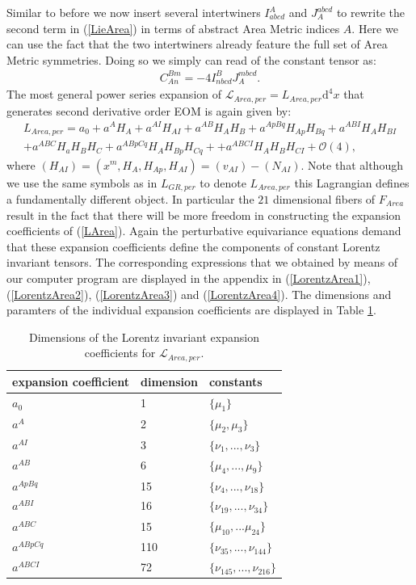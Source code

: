 \documentclass[a4paper,12pt, DIV=14, BCOR=5mm, twoside, headsepline, numbers=noenddot]{scrbook}
\begin{document}
Similar to before we now insert several intertwiners $I^A_{abcd}$ and $J_A^{abcd}$ to rewrite the second term in (\ref{LieArea}) in terms of abstract Area Metric indices $A$. Here we can use the fact that the two intertwiners already feature the full set of Area Metric symmetries.  Doing so we simply can read of the constant tensor as:
\begin{align}\label{areaGotayMInter}
    C_{An}^{Bm} = -4 I^B_{nbcd} J_A^{mbcd}.
\end{align}
The most general power series expansion of $\mathcal{L}_{Area,per} = L_{Area,per}\mathrm{d}^4x$ that generates second derivative order EOM is again given by:
\begin{align}\label{LArea}
    L_{Area,per} =  a_0 + a^A H_A + a^{AI}H_{AI} + a^{AB} H_{A}H_{B} + a^{ApBq} H_{Ap}H_{Bq} + a^{ABI} H_{A} H_{BI} \\
    + a^{ABC} H_a H_B H_C + a^{ABpCq} H_{A}H_{Bp}H_{Cq} +
    + a^{ABCI} H_A H_B H_{CI} 
    + \mathcal{O}(4),
\end{align}
where $(H_{AI}) = (x^m,H_A,H_{Ap},H_{AI}) = (v_{AI}) - (N_{AI})$. Note that although we use the same symbols as in $L_{GR,per}$ to denote $L_{Area,per}$ this Lagrangian defines a fundamentally different object. In particular the $21$ dimensional fibers of  $F_{Area}$ result in the fact that there will be more freedom in constructing the expansion coefficients of (\ref{LArea}). Again the perturbative equivariance equations demand that these expansion coefficients define the components of constant Lorentz invariant tensors. The corresponding expressions that we obtained by means of our computer program are displayed in the appendix in (\ref{LorentzArea1}), (\ref{LorentzArea2}), (\ref{LorentzArea3}) and (\ref{LorentzArea4}). The dimensions and paramters of the individual expansion coefficients are displayed in Table \ref{AreaExp}.
\begin{table}
\centering 
\begin{tabular}{lll} \toprule
    expansion coefficient & dimension & constants   \\ \midrule
    $a_0$ & 1 & $\{\mu_1\}$ \\
    $a^A$ & 2 & $\{\mu_2,\mu_3\}$ \\
    $a^{AI}$ & 3 & $\{\nu_1,..., \nu_3\}$ \\
    $a^{AB}$ & 6 & $\{\mu_4,..., \mu_9 \} $ \\
    $a^{ApBq}$ & 15 & $\{\nu_4,...,\nu_{18}\}$ \\
    $a^{ABI}$ & 16 & $\{ \nu_{19},...,\nu_{34} \}$ \\
    $a^{ABC}$ & 15 & $\{ \mu_{10},...\mu_{24} \}$\\
    $a^{ABpCq}$ & 110 & $\{\nu_{35},...,\nu_{144} \}$ \\
    $a^{ABCI}$ & 72 & $\{ \nu_{145},...,\nu_{216}\}$ \\ \bottomrule
\end{tabular}
\caption{Dimensions of the Lorentz invariant expansion coefficients for $\mathcal{L}_{Area,per}$.}\label{AreaExp}
\end{table}
\end{document}
